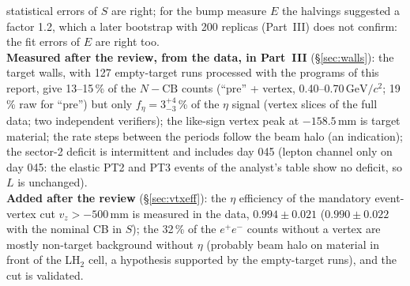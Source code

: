 \documentclass[11pt,a4paper]{article}
\newcommand{\ee}{\ensuremath{e^{+}e^{-}}\xspace}
\newcommand{\GeVcc}{\ensuremath{\mathrm{GeV}/c^{2}}\xspace}
\newcommand{\vz}{\ensuremath{v_z}\xspace}
\begin{document}
{statistical errors of $S$ are right; for the bump measure $E$ the halvings suggested a factor 1.2, which a later bootstrap with 200 replicas
(Part~III) does not confirm: the fit errors of $E$ are right too.\\[0.3em]
\textbf{Measured after the review, from the data, in Part~III} (\S\ref{sec:walls}): the target walls, with 127 empty-target runs processed
with the programs of this report, give 13--15\,\% of the $N-\mathrm{CB}$ counts (``pre'' + vertex, 0.40--0.70\,\GeVcc; 19\,\% raw for ``pre'') but
only $f_\eta=3^{+4}_{-3}$\,\% of the $\eta$ signal (vertex slices of the full data; two independent verifiers); the like-sign vertex peak at
$-158.5$\,mm is target material; the rate steps between the periods follow the beam halo (an indication); the sector-2 deficit is
intermittent and includes day 045 (lepton channel only on day 045: the elastic PT2 and PT3 events of the analyst's table show no deficit,
so $L$ is unchanged).\\[0.3em]
\textbf{Added after the review} (\S\ref{sec:vtxeff}): the $\eta$ efficiency of the mandatory event-vertex cut $\vz>-500$\,mm is measured in the
data, $0.994\pm0.021$ ($0.990\pm0.022$ with the nominal CB in $S$); the 32\,\% of the \ee counts without a vertex are mostly non-target
background without $\eta$ (probably beam halo on material in front of the LH$_2$ cell, a hypothesis supported by the empty-target runs), and
the cut is validated.}
\end{document}
